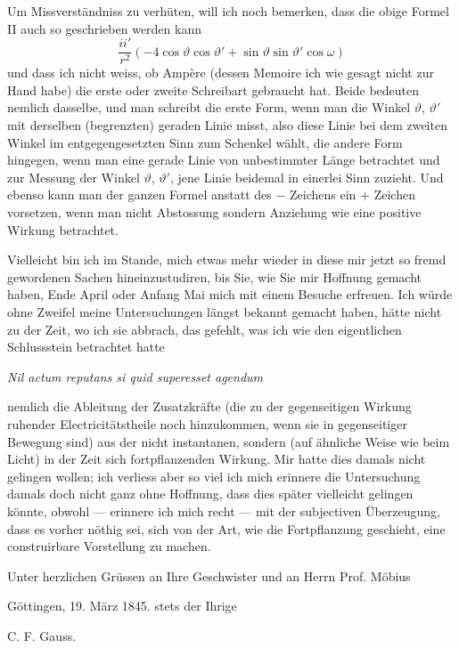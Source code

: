 \documentclass[fontsize=10pt,paper=a5,pagesize=auto]{scrbook}
\newcommand{\origpage}[1]{\marginpar{\footnotesize\textit{S. #1}}}
\begin{document}
\origpage{635}
Um Missverständniss zu verhüten, will ich noch bemerken, dass die obige Formel II auch so geschrieben werden kann
\[
\frac{ii'}{r^2}(-4\cos\vartheta \cos\vartheta' + \sin\vartheta \sin\vartheta' \cos\omega)
\]
und dass ich nicht weiss, ob Ampère (dessen Memoire ich wie gesagt nicht zur Hand habe) die erste oder zweite Schreibart gebraucht hat. Beide bedeuten nemlich dasselbe, und man schreibt die erste Form, wenn man die Winkel $\vartheta$, $\vartheta'$ mit derselben (begrenzten) geraden Linie misst, also diese Linie bei dem zweiten Winkel im entgegengesetzten Sinn zum Schenkel wählt, die andere Form hingegen, wenn man eine gerade Linie von unbestimmter Länge betrachtet und zur Messung der Winkel $\vartheta$, $\vartheta'$, jene Linie beidemal in einerlei Sinn zuzieht. Und ebenso kann man der ganzen Formel anstatt des $-$ Zeichens ein $+$ Zeichen vorsetzen, wenn man nicht Abstossung sondern Anziehung wie eine positive Wirkung betrachtet.

Vielleicht bin ich im Stande, mich etwas mehr wieder in diese mir jetzt so fremd gewordenen Sachen hineinzustudiren, bis Sie, wie Sie mir Hoffnung gemacht haben, Ende April oder Anfang Mai mich mit einem Besuche erfreuen. Ich würde ohne Zweifel meine Untersuchungen längst bekannt gemacht haben, hätte nicht zu der Zeit, wo ich sie abbrach, das gefehlt, was ich wie den eigentlichen Schlussstein betrachtet hatte
\begin{center}
\textit{Nil actum reputans si quid superesset agendum}
\end{center}
nemlich die Ableitung der Zusatzkräfte (die zu der gegenseitigen Wirkung ruhender Electricitätstheile noch hinzukommen, wenn sie in gegenseitiger Bewegung sind) aus der nicht instantanen, sondern (auf ähnliche Weise wie beim Licht) in der Zeit sich fortpflanzenden Wirkung. Mir hatte dies damals nicht gelingen wollen; ich verliess aber so viel ich mich erinnere die Untersuchung damals doch nicht ganz ohne Hoffnung, dass dies später vielleicht gelingen könnte, obwohl --- erinnere ich mich recht --- mit der subjectiven Überzeugung, dass es vorher nöthig sei, sich von der Art, wie die Fortpflanzung geschieht, eine construirbare Vorstellung zu machen.

Unter herzlichen Grüssen an Ihre Geschwister und an Herrn Prof. Möbius

\hfill Göttingen, 19. März 1845. \hspace{2em} stets der Ihrige

\hfill C. F. Gauss.

\newpage
\end{document}
